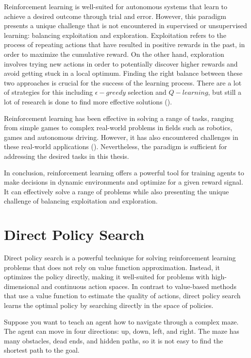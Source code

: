 Reinforcement learning is well-suited for autonomous systems that learn to achieve a desired outcome through trial and error. However, this paradigm presents a unique challenge that is not encountered in supervised or unsupervised learning: balancing exploitation and exploration. Exploitation refers to the process of repeating actions that have resulted in positive rewards in the past, in order to maximize the cumulative reward. On the other hand, exploration involves trying new actions in order to potentially discover higher rewards and avoid getting stuck in a local optimum. Finding the right balance between these two approaches is crucial for the success of the learning process. There are a lot of strategies for this including $\epsilon - greedy$ selection and $Q-learning$, but still a lot of research is done to find more effective solutions (\cite{coggan_exploration_nodate}).

Reinforcement learning has been effective in solving a range of tasks, ranging from simple games to complex real-world problems in fields such as robotics, games and autonomous driving. However, it has also encountered challenges in these real-world applications (\cite{zhu_ingredients_2020}). Nevertheless, the paradigm is sufficient for addressing the desired tasks in this thesis.

In conclusion, reinforcement learning offers a powerful tool for training agents to make decisions in dynamic environments and optimize for a given reward signal. It can effectively solve a range of problems while also presenting the unique challenge of balancing exploitation and exploration.

\section{Direct Policy Search}
Direct policy search is a powerful technique for solving reinforcement learning problems that does not rely on value function approximation. Instead, it optimizes the policy directly, making it well-suited for problems with high-dimensional and continuous action spaces. In contrast to value-based methods that use a value function to estimate the quality of actions, direct policy search learns the optimal policy by searching directly in the space of policies.

Suppose you want to teach an agent how to navigate through a complex maze. The agent can move in four directions: up, down, left, and right. The maze has many obstacles, dead ends, and hidden paths, so it is not easy to find the shortest path to the goal.

